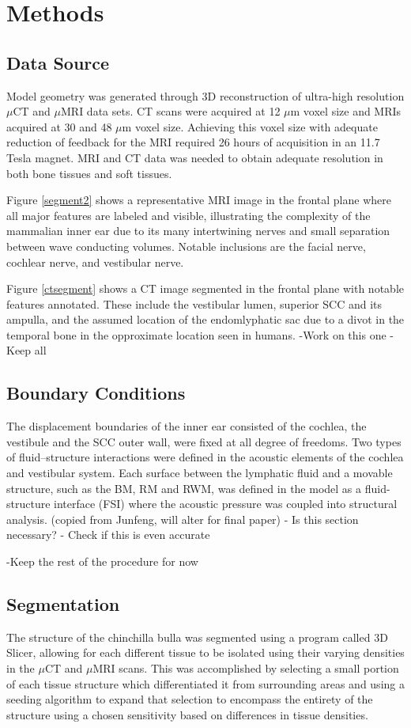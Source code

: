 \documentclass[12pt]{article}
\begin{document}
\section{Methods}
\subsection{Data Source}
Model geometry was generated through 3D reconstruction of ultra-high resolution $\mu$CT and $\mu$MRI data sets. CT scans were acquired at 12 $\mu$m voxel size and MRIs acquired at 30 and 48 $\mu$m voxel size. Achieving this voxel size with adequate reduction of feedback for the MRI required 26 hours of acquisition in an 11.7 Tesla magnet. MRI and CT data was needed to obtain adequate resolution in both bone tissues and soft tissues.

Figure \ref{segment2} shows a representative MRI image in the frontal plane where all major features are labeled and visible, illustrating the complexity of the mammalian inner ear due to its many intertwining nerves and small separation between wave conducting volumes. Notable inclusions are the facial nerve, cochlear nerve, and vestibular nerve.

Figure \ref{ctsegment} shows a CT image segmented in the frontal plane with notable features annotated. These include the vestibular lumen, superior SCC and its ampulla, and the assumed location of the endomlyphatic sac due to a divot in the temporal bone in the opproximate location seen in humans.\cite{ensac}
-Work on this one
-Keep all

\subsection{Boundary Conditions}
The displacement boundaries of the inner ear consisted of the cochlea, the vestibule and the SCC outer wall, were fixed at all degree of freedoms. Two types of fluid–structure interactions were defined in the acoustic elements of the cochlea and vestibular system. Each surface between the lymphatic fluid and a movable structure, such as the BM, RM and RWM, was defined in the model as a fluid-structure interface (FSI) where the acoustic pressure was coupled into structural analysis. (copied from Junfeng, will alter for final paper)
- Is this section necessary?
- Check if this is even accurate

-Keep the rest of the procedure for now
\subsection{Segmentation}
The structure of the chinchilla bulla was segmented using a program called 3D Slicer, allowing for each different tissue to be isolated using their varying densities in the $\mu$CT and $\mu$MRI scans. \cite{slicer} This was accomplished by selecting a small portion of each tissue structure which differentiated it from surrounding areas and using a seeding algorithm to expand that selection to encompass the entirety of the structure using a chosen sensitivity based on differences in tissue densities.
\end{document}
